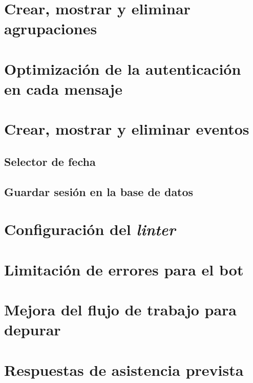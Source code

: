 \section{Crear, mostrar y eliminar agrupaciones}



\section{Optimización de la autenticación en cada mensaje}



\section{Crear, mostrar y eliminar eventos}


\subsection{Selector de fecha}


\subsection{Guardar sesión en la base de datos}





\section{Configuración del \textit{linter}}



\section{Limitación de errores para el bot}\label{section:errorBoundary}


\section{Mejora del flujo de trabajo para depurar}


\section{Respuestas de asistencia prevista}



